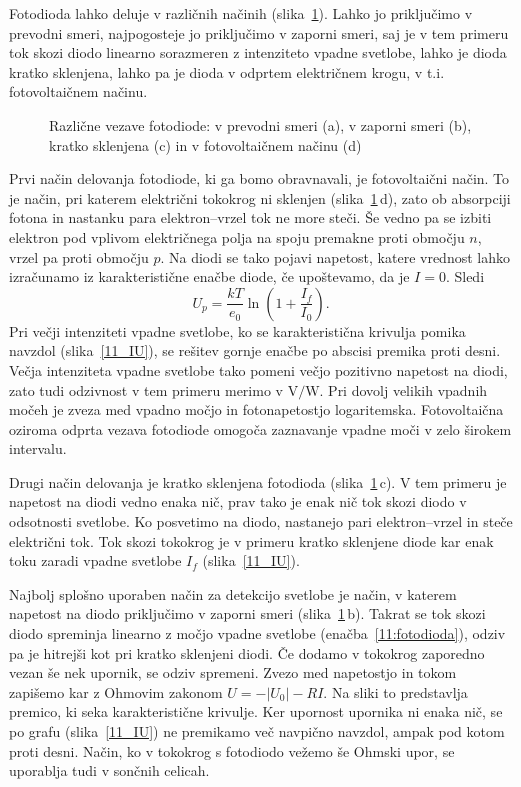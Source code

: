 Fotodioda lahko deluje v različnih načinih (slika~\ref{11_PD}). 
Lahko jo priključimo v prevodni smeri,
najpogosteje jo priključimo v zaporni smeri, saj je v
tem primeru tok skozi diodo linearno sorazmeren z intenziteto vpadne svetlobe, lahko 
je dioda kratko sklenjena, lahko pa je dioda v odprtem električnem krogu, v t.i. fotovoltaičnem 
načinu. 
\begin{figure}[h]
\centering
\def\svgwidth{130truemm} 

\caption{Različne vezave fotodiode: v prevodni smeri (a), v zaporni smeri (b), kratko sklenjena (c) in 
v fotovoltaičnem načinu (d)}
\label{11_PD}
\end{figure}

Prvi način delovanja fotodiode, ki ga bomo obravnavali, je fotovoltaični način.
To je način, pri katerem električni tokokrog ni sklenjen (slika~\ref{11_PD}\,d), 
zato ob absorpciji fotona in nastanku para elektron--vrzel tok ne more steči. 
Še vedno pa se izbiti elektron pod vplivom električnega polja
na spoju premakne proti območju $n$, vrzel pa proti območju $p$.
Na diodi se tako pojavi napetost, 
katere vrednost lahko izračunamo iz karakteristične enačbe diode, če upoštevamo, da je $I=0$. Sledi
\begin{equation}
U_p = \frac{kT}{e_0}\ln \left(1+ \frac{I_f}{I_0}\right).
\end{equation}
Pri večji intenziteti vpadne svetlobe, ko se karakteristična krivulja 
pomika navzdol (slika~\ref{11_IU}), se rešitev gornje enačbe po abscisi premika proti desni.
Večja intenziteta vpadne svetlobe tako pomeni večjo 
pozitivno napetost na diodi, zato tudi odzivnost v tem primeru merimo v $\si{\volt}/\si{\watt}$.
Pri dovolj velikih vpadnih močeh je zveza med vpadno močjo in fotonapetostjo
logaritemska. Fotovoltaična oziroma odprta vezava fotodiode omogoča 
zaznavanje vpadne moči v zelo širokem intervalu. 

Drugi način delovanja je kratko sklenjena fotodioda (slika~\ref{11_PD}\,c).
V tem primeru je  napetost na diodi 
vedno enaka nič, prav tako je enak nič tok skozi diodo v odsotnosti svetlobe. 
Ko posvetimo na diodo, nastanejo pari elektron--vrzel in steče električni tok.
Tok skozi tokokrog je v primeru kratko sklenjene diode kar enak toku 
zaradi vpadne svetlobe $I_f$ (slika~\ref{11_IU}).

Najbolj splošno uporaben način za detekcijo svetlobe je način, v katerem 
napetost na diodo priključimo v zaporni smeri (slika~\ref{11_PD}\,b).
Takrat se tok skozi diodo spreminja linearno z močjo vpadne svetlobe
(enačba~\ref{11:fotodioda}), odziv pa je hitrejši
kot pri kratko sklenjeni diodi. Če dodamo v tokokrog zaporedno vezan še nek upornik, se odziv
spremeni. Zvezo med napetostjo in tokom zapišemo kar z Ohmovim zakonom $U = -|U_0|-RI$. 
Na sliki to predstavlja premico, ki seka karakteristične krivulje. Ker upornost
upornika ni enaka nič, se po grafu (slika~\ref{11_IU}) ne premikamo več navpično navzdol, 
ampak pod kotom proti desni. Način, ko v tokokrog s fotodiodo vežemo še Ohmski upor,
se uporablja tudi v sončnih celicah. 

